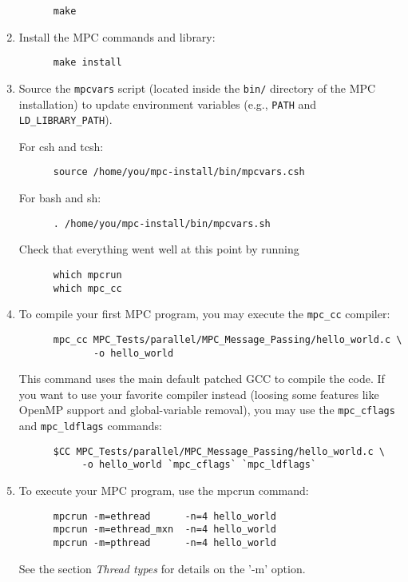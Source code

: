 \documentclass[a4paper,11pt]{article}
\begin{document}
\begin{enumerate}
\begin{verbatim}
      make
\end{verbatim}

\item  Install the MPC commands and library:

\begin{verbatim}
      make install
\end{verbatim}

\item Source the \texttt{mpcvars} script (located inside the \texttt{bin/} directory of the MPC installation) to update environment variables (e.g., \texttt{PATH} and \texttt{LD\_LIBRARY\_PATH}).

For csh and tcsh:

\begin{verbatim}
      source /home/you/mpc-install/bin/mpcvars.csh
\end{verbatim}

    For bash and sh:

\begin{verbatim}
      . /home/you/mpc-install/bin/mpcvars.sh
\end{verbatim}


    Check that everything went well at this point by running

\begin{verbatim}
      which mpcrun
      which mpc_cc
\end{verbatim}

\item  To compile your first MPC program, you may execute the
    \texttt{mpc\_cc} compiler:

\begin{verbatim}
      mpc_cc MPC_Tests/parallel/MPC_Message_Passing/hello_world.c \
             -o hello_world
\end{verbatim}

This command uses the main default patched GCC to compile the code.
If you want to use your favorite compiler instead (loosing some features like
    OpenMP support and global-variable removal), you may use the
\texttt{mpc\_cflags} and \texttt{mpc\_ldflags} commands:

\begin{verbatim}
      $CC MPC_Tests/parallel/MPC_Message_Passing/hello_world.c \
           -o hello_world `mpc_cflags` `mpc_ldflags`
\end{verbatim}

\item  To execute your MPC program, use the mpcrun command:

\begin{verbatim}
      mpcrun -m=ethread      -n=4 hello_world
      mpcrun -m=ethread_mxn  -n=4 hello_world
      mpcrun -m=pthread      -n=4 hello_world
\end{verbatim}

    See the section \emph{Thread types} for details on the '-m' option.

\end{enumerate}
\end{document}
